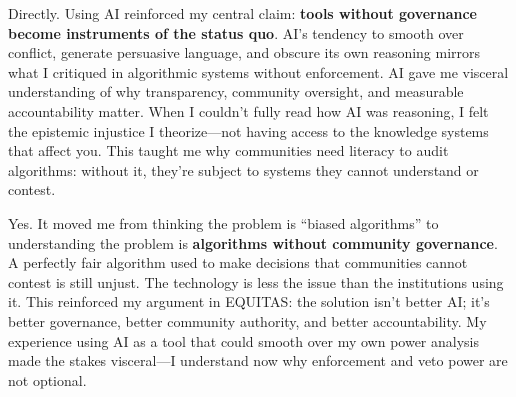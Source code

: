 \documentclass[12pt,a4paper]{article}
\begin{document}
Directly. Using AI reinforced my central claim: \textbf{tools without governance become instruments of the status quo}. AI's tendency to smooth over conflict, generate persuasive language, and obscure its own reasoning mirrors what I critiqued in algorithmic systems without enforcement. AI gave me visceral understanding of why transparency, community oversight, and measurable accountability matter. When I couldn't fully read how AI was reasoning, I felt the epistemic injustice I theorize—not having access to the knowledge systems that affect you. This taught me why communities need literacy to audit algorithms: without it, they're subject to systems they cannot understand or contest.

Yes. It moved me from thinking the problem is ``biased algorithms'' to understanding the problem is \textbf{algorithms without community governance}. A perfectly fair algorithm used to make decisions that communities cannot contest is still unjust. The technology is less the issue than the institutions using it. This reinforced my argument in EQUITAS: the solution isn't better AI; it's better governance, better community authority, and better accountability. My experience using AI as a tool that could smooth over my own power analysis made the stakes visceral—I understand now why enforcement and veto power are not optional.
\end{document}

